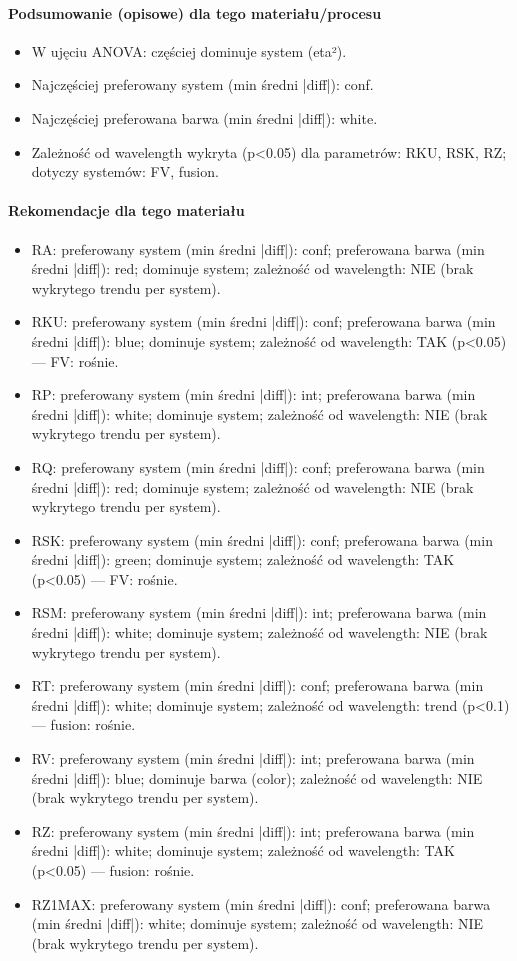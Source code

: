 \documentclass[
  10pt,
]{article}
\begin{document}
\paragraph{Podsumowanie (opisowe) dla tego materiału/procesu}
\begin{itemize}
\item W ujęciu ANOVA: częściej dominuje system (eta²).
\item Najczęściej preferowany system (min średni |diff|): conf.
\item Najczęściej preferowana barwa (min średni |diff|): white.
\item Zależność od wavelength wykryta (p<0.05) dla parametrów: RKU, RSK, RZ; dotyczy systemów: FV, fusion.
\end{itemize}
\paragraph{Rekomendacje dla tego materiału}
\begin{itemize}
\item RA: preferowany system (min średni |diff|): conf; preferowana barwa (min średni |diff|): red; dominuje system; zależność od wavelength: NIE (brak wykrytego trendu per system).
\item RKU: preferowany system (min średni |diff|): conf; preferowana barwa (min średni |diff|): blue; dominuje system; zależność od wavelength: TAK (p<0.05) — FV: rośnie.
\item RP: preferowany system (min średni |diff|): int; preferowana barwa (min średni |diff|): white; dominuje system; zależność od wavelength: NIE (brak wykrytego trendu per system).
\item RQ: preferowany system (min średni |diff|): conf; preferowana barwa (min średni |diff|): red; dominuje system; zależność od wavelength: NIE (brak wykrytego trendu per system).
\item RSK: preferowany system (min średni |diff|): conf; preferowana barwa (min średni |diff|): green; dominuje system; zależność od wavelength: TAK (p<0.05) — FV: rośnie.
\item RSM: preferowany system (min średni |diff|): int; preferowana barwa (min średni |diff|): white; dominuje system; zależność od wavelength: NIE (brak wykrytego trendu per system).
\item RT: preferowany system (min średni |diff|): conf; preferowana barwa (min średni |diff|): white; dominuje system; zależność od wavelength: trend (p<0.1) — fusion: rośnie.
\item RV: preferowany system (min średni |diff|): int; preferowana barwa (min średni |diff|): blue; dominuje barwa (color); zależność od wavelength: NIE (brak wykrytego trendu per system).
\item RZ: preferowany system (min średni |diff|): int; preferowana barwa (min średni |diff|): white; dominuje system; zależność od wavelength: TAK (p<0.05) — fusion: rośnie.
\item RZ1MAX: preferowany system (min średni |diff|): conf; preferowana barwa (min średni |diff|): white; dominuje system; zależność od wavelength: NIE (brak wykrytego trendu per system).
\end{itemize}
\end{document}
